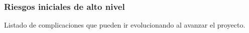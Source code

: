 \subsubsection{Riesgos iniciales de alto nivel}
Listado de complicaciones que pueden ir evolucionando al avanzar el proyecto.
